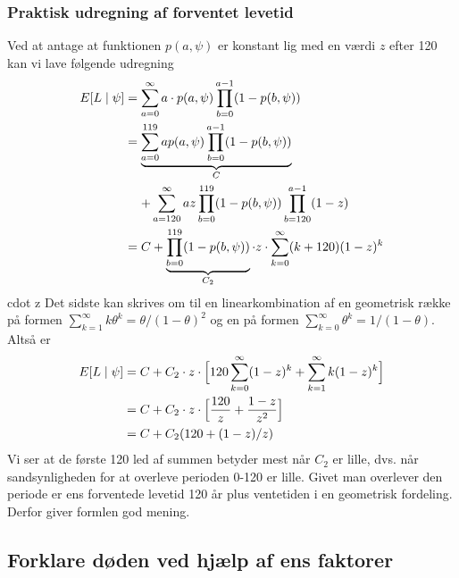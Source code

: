 \documentclass[a4paper, 12pt]{memoir}
\begin{document}
\subsubsection{Praktisk udregning af forventet levetid}
Ved at antage at funktionen $p(a, \psi)$ er konstant lig med en værdi $z$ efter 120 kan vi lave følgende udregning
\begin{align*}
E[L\mid \psi] &= \sum_{a=0}^\infty a \cdot p(a, \psi)\prod_{b=0}^{a-1} (1-p(b,\psi))\\
&=\begin{lgathered}[t]\underbrace{\sum_{a=0}^{119} a p(a,\psi) \prod_{b=0}^{a-1} (1-p(b,\psi))}_{C}\\
+\sum_{a=120}^{\infty} a z \prod_{b=0}^{119} (1-p(b,\psi))\prod_{b=120}^{a-1}(1-z)
\end{lgathered}\\
&= C+ \underbrace{\prod_{b=0}^{119} (1-p(b,\psi))}_{C_2} \cdot z\cdot \sum_{k=0}^{\infty}(k+120)(1-z)^k
\end{align*}cdot z
Det sidste kan skrives om til en linearkombination af en geometrisk række på formen $\sum_{k=1}^{\infty}k\theta^k=\theta/(1-\theta)^2$ og en på formen $\sum_{k=0}^{\infty}\theta^k=1/(1-\theta)$. Altså er
\begin{align*}
E[L\mid\psi]&=C+C_2\cdot z\cdot \Bigl[  120 \sum_{k=0}^{\infty}(1-z)^k+\sum_{k=1}^{\infty}k(1-z)^k \Bigr]\\
&=C+C_2\cdot z\cdot  \Bigl[      \frac{120}{z}+\frac{1-z}{z^2}     \Bigr]\\
&=C+C_2(120+(1-z)/z)
\end{align*}
Vi ser at de første 120 led af summen betyder mest når $C_2$ er lille, dvs. når sandsynligheden for at overleve perioden 0-120 er lille. Givet man overlever den periode er ens forventede levetid 120 år plus ventetiden i en geometrisk fordeling. Derfor giver formlen god mening.


\subsection{Forklare døden ved hjælp af ens faktorer}
\end{document}
